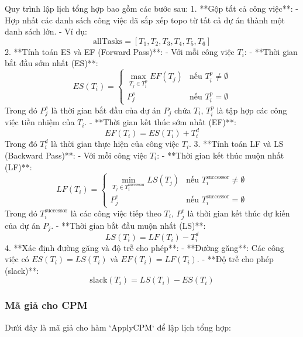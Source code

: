 \documentclass[a4paper,12pt]{article}
\begin{document}
Quy trình lập lịch tổng hợp bao gồm các bước sau:
1. **Gộp tất cả công việc**:
    - Hợp nhất các danh sách công việc đã sắp xếp topo từ tất cả dự án thành một danh sách lớn.
    - Ví dụ:
      \[
      \text{allTasks} = [T_1, T_2, T_3, T_4, T_5, T_6]
      \]
2. **Tính toán ES và EF (Forward Pass)**:
    - Với mỗi công việc \( T_i \):
      - **Thời gian bắt đầu sớm nhất (ES)**:
         \[
         ES(T_i) = 
         \begin{cases} 
         \max_{T_j \in T_i^p} EF(T_j) & \text{nếu } T_i^p \neq \emptyset \\
         P_j^s & \text{nếu } T_i^p = \emptyset
         \end{cases}
         \]
         Trong đó \( P_j^s \) là thời gian bắt đầu của dự án \( P_j \) chứa \( T_i \), \( T_i^p \) là tập hợp các công việc tiền nhiệm của \( T_i \).
      - **Thời gian kết thúc sớm nhất (EF)**:
         \[
         EF(T_i) = ES(T_i) + T_i^d
         \]
         Trong đó \( T_i^d \) là thời gian thực hiện của công việc \( T_i \).
3. **Tính toán LF và LS (Backward Pass)**:
    - Với mỗi công việc \( T_i \):
      - **Thời gian kết thúc muộn nhất (LF)**:
         \[
         LF(T_i) = 
         \begin{cases} 
         \min_{T_j \in T_i^{\text{successor}}} LS(T_j) & \text{nếu } T_i^{\text{successor}} \neq \emptyset \\
         P_j^e & \text{nếu } T_i^{\text{successor}} = \emptyset
         \end{cases}
         \]
         Trong đó \( T_i^{\text{successor}} \) là các công việc tiếp theo \( T_i \), \( P_j^e \) là thời gian kết thúc dự kiến của dự án \( P_j \).
      - **Thời gian bắt đầu muộn nhất (LS)**:
         \[
         LS(T_i) = LF(T_i) - T_i^d
         \]
4. **Xác định đường găng và độ trễ cho phép**:
    - **Đường găng**: Các công việc có \( ES(T_i) = LS(T_i) \) và \( EF(T_i) = LF(T_i) \).
    - **Độ trễ cho phép (slack)**:
      \[
      \text{slack}(T_i) = LS(T_i) - ES(T_i)
      \]

\subsubsection*{Mã giả cho CPM}

Dưới đây là mã giả cho hàm `ApplyCPM` để lập lịch tổng hợp:
\end{document}
